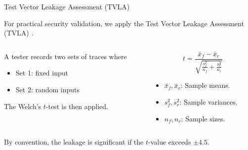\begin{frame}{Test Vector Leakage Assessment (TVLA)}

For practical security validation, we apply the Test Vector Leakage Assessment (TVLA) \cite{gilbert2011testing}.
\pause

\begin{columns}

\begin{column}{0.5\textwidth}

A tester records two sets of traces where
\pause

\begin{itemize}
	\item Set 1: fixed input
	\pause
	\item Set 2: random inputs
\end{itemize}
\pause

The Welch's $t$-test is then applied.

\end{column}

\pause

\begin{column}{0.4\textwidth}

\[ 
	t = \frac{ \bar{x}_f - \bar{x}_r }{ \sqrt{ \frac{s_f^2}{n_f} + \frac{s_r^2}{n_r} } }
\]

\begin{itemize}
	\item $\bar{x}_f, \bar{x}_r$: Sample means.
	
	\item $s_f^2, s_r^2$: Sample variances.

	\item $n_f, n_r$: Sample sizes.
\end{itemize}

\end{column}

\end{columns}
\pause
\medskip
\medskip

By convention, the leakage is significant if the $t$-value exceeds $\pm 4.5$.

\end{frame}
